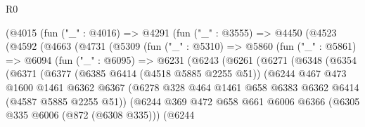 \begin{lexlean}{R0}
\begin{coremodule}
                (@4015
                  (fun ("_" : @4016) =>
                  @4291
                    (fun ("_" : @3555) =>
                    @4450
                      (@4523
                        (@4592
                          (@4663
                            (@4731
                              (@5309
                                (fun ("_" : @5310) =>
                                @5860
                                  (fun ("_" : @5861) =>
                                  @6094
                                    (fun ("_" : @6095) =>
                                    @6231
                                      (@6243
                                        (@6261
                                          (@6271
                                            (@6348
                                              (@6354
                                                (@6371
                                                  (@6377
                                                    (@6385 @6414 (@4518 @5885 @2255 @51))
                                                    (@6244
                                                      @467
                                                      @473
                                                      @1600
                                                      @1461
                                                      @6362
                                                      @6367
                                                      (@6278
                                                        @328
                                                        @464
                                                        @1461
                                                        @658
                                                        @6383
                                                        @6362
                                                        @6414
                                                        (@4587 @5885 @2255 @51))
                                                      (@6244
                                                        @369
                                                        @472
                                                        @658
                                                        @661
                                                        @6006
                                                        @6366
                                                        (@6305 @335 @6006 (@872 (@6308 @335)))
                                                        (@6244

\end{coremodule}
\end{lexlean}
